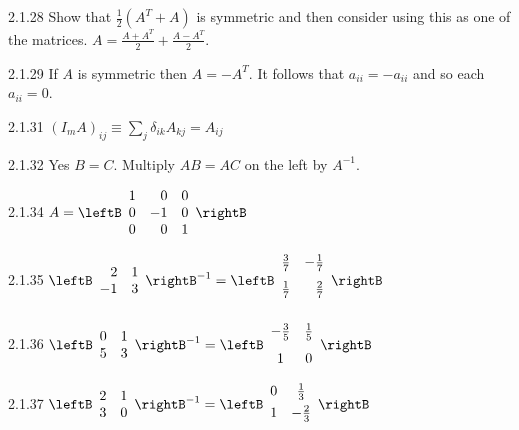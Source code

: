\begin{Answer}{2.1.28}
Show that $\frac{1}{2}\left( A^{T}+A\right) $ is symmetric and then consider using this
as one of the matrices. $A=\frac{A+A^{T}}{2}+\frac{A-A^{T}}{2}.$
\end{Answer}
\begin{Answer}{2.1.29}
If $A$ is symmetric then $A=-A^{T}.$ It follows that $a_{ii}=-a_{ii}$ and so each $a_{ii}=0$.
\end{Answer}
\begin{Answer}{2.1.31}
 $\left(
I_{m}A\right) _{ij}\equiv \sum_{j}\delta _{ik}A_{kj}=A_{ij}$
\end{Answer}
\begin{Answer}{2.1.32}
Yes $B=C$. Multiply $AB = AC$ on the left by $A^{-1}$.
\end{Answer}
\begin{Answer}{2.1.34}
$A = \leftB
\begin{array}{rrr}
1 & 0 & 0 \\
0 & -1 & 0 \\
0 & 0 & 1
\end{array}
\rightB $
\end{Answer}
\begin{Answer}{2.1.35}
$\leftB
\begin{array}{rr}
2 & 1 \\
-1 & 3
\end{array}
\rightB^{-1}= \leftB
\begin{array}{rr}
\vspace{0.05in}\frac{3}{7} & -\vspace{0.05in}\frac{1}{7} \\
\vspace{0.05in}\frac{1}{7} & \vspace{0.05in}\frac{2}{7}
\end{array}
\rightB$
\end{Answer}
\begin{Answer}{2.1.36}
$\leftB
\begin{array}{cc}
0 & 1 \\
5 & 3
\end{array}
\rightB^{-1}= \leftB
\begin{array}{cc}
-\vspace{0.05in}\frac{3}{5} & \vspace{0.05in}\frac{1}{5} \\
1 & 0
\end{array}
\rightB$
\end{Answer}
\begin{Answer}{2.1.37}
$\leftB
\begin{array}{cc}
2 & 1 \\
3 & 0
\end{array}
\rightB^{-1}= \leftB
\begin{array}{cc}
0 & \vspace{0.05in}\frac{1}{3} \\
1 & -\vspace{0.05in}\frac{2}{3}
\end{array}
\rightB$
\end{Answer}
